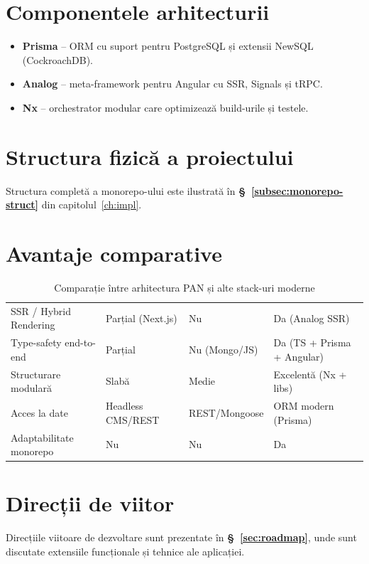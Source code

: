 \section{Componentele arhitecturii}
\begin{itemize}
  \item \textbf{Prisma} – ORM cu suport pentru PostgreSQL și extensii NewSQL (CockroachDB).
  \item \textbf{Analog} – meta-framework pentru Angular cu SSR, Signals și tRPC.
  \item \textbf{Nx} – orchestrator modular care optimizează build-urile și testele.
\end{itemize}

\section{Structura fizică a proiectului}
Structura completă a monorepo-ului este ilustrată în \textbf{§~\ref{subsec:monorepo-struct}} din capitolul~\ref{ch:impl}.

\section{Avantaje comparative}
\begin{table}[H]
  \centering
  \small
  \begin{tabularx}{\linewidth}{@{} Y Y Y Y @{}}
    \toprule
     &  &  &  \\
    \midrule
    SSR / Hybrid Rendering  & Parțial (Next.js) & Nu & Da (Analog SSR) \\
    Type-safety end-to-end  & Parțial           & Nu (Mongo/JS) & Da (TS + Prisma + Angular) \\
    Structurare modulară    & Slabă             & Medie         & Excelentă (Nx + libs) \\
    Acces la date           & Headless CMS/REST & REST/Mongoose & ORM modern (Prisma) \\
    Adaptabilitate monorepo & Nu                & Nu            & Da \\
    \bottomrule
  \end{tabularx}
  \caption{Comparație între arhitectura PAN și alte stack-uri moderne}
  \label{tab:pan-adv}
\end{table}

\section{Direcții de viitor}
Direcțiile viitoare de dezvoltare sunt prezentate în \textbf{§~\ref{sec:roadmap}}, unde sunt discutate extensiile funcționale și tehnice ale aplicației.

